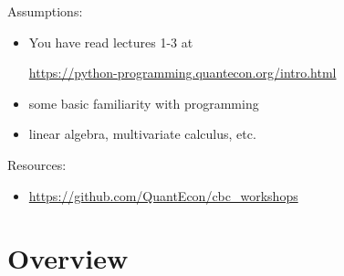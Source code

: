 \begin{frame}


    Assumptions:

    \begin{itemize}
        \item You have read lectures 1-3 at
            \begin{center}
                \url{https://python-programming.quantecon.org/intro.html}
            \end{center}
        \vspace{0.3em}
        \vspace{0.3em}
        \item some basic familiarity with programming
        \vspace{0.3em}
        \vspace{0.3em}
        \item linear algebra, multivariate calculus, etc.
    \end{itemize}

        \vspace{0.3em}
        \vspace{0.3em}
        \vspace{0.3em}
        \vspace{0.3em}
        \vspace{0.3em}
    Resources:

    \begin{itemize}
        \item \url{https://github.com/QuantEcon/cbc_workshops}
    \end{itemize}


\end{frame}




\section{Overview}



